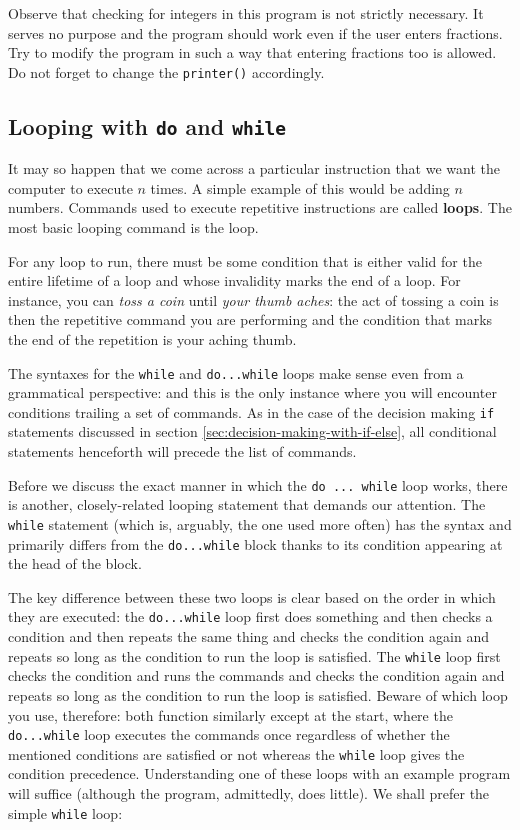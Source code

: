 \documentclass[11pt,oneside]{article}
\begin{document}
{{{{{{{{{ Observe that checking for integers in this program is not strictly necessary. It serves no purpose and the program should work even if the user enters fractions. Try to modify the program in such a way that entering fractions too is allowed. Do not forget to change the \verb+printer()+ accordingly.

\subsection{Looping with \texttt{\large \lowercase{do}} and  \texttt{\large \lowercase{while}}}

It may so happen that we come across a particular instruction that we want the computer to execute $n$ times. A simple example of this would be adding $n$ numbers. Commands used to execute repetitive instructions are called \textbf{loops}. The most basic looping command is the  loop.

For any loop to run, there must be some condition that is either valid for the entire lifetime of a loop and whose invalidity marks the end of a loop. For instance, you can \textit{toss a coin} until \textit{your thumb aches}: the act of tossing a coin is then the repetitive command you are performing and the condition that marks the end of the repetition is your aching thumb.

The syntaxes for the \verb+while+ and \verb+do...while+ loops make sense even from a grammatical perspective:  and this is the only instance where you will encounter conditions trailing a set of commands. As in the case of the decision making \verb+if+ statements discussed in section \ref{sec:decision-making-with-if-else}, all conditional statements henceforth will precede the list of commands.

Before we discuss the exact manner in which the \verb+do ... while+ loop works, there is another, closely-related looping statement that demands our attention. The \verb+while+ statement (which is, arguably, the one used more often) has the syntax  and primarily differs from the \verb+do...while+ block thanks to its condition appearing at the head of the block.

The key difference between these two loops is clear based on the order in which they are executed: the \verb+do...while+ loop first does something and then checks a condition and then repeats the same thing and checks the condition again and repeats so long as the condition to run the loop is satisfied. The \verb+while+ loop first checks the condition and runs the commands and checks the condition again and repeats so long as the condition to run the loop is satisfied. Beware of which loop you use, therefore: both function similarly except at the start, where the \verb+do...while+ loop executes the commands once regardless of whether the mentioned conditions are satisfied or not whereas the \verb+while+ loop gives the condition precedence. Understanding one of these loops with an example program will suffice (although the program, admittedly, does little). We shall prefer the simple \verb+while+ loop:

}}}}}}}}}
\end{document}
